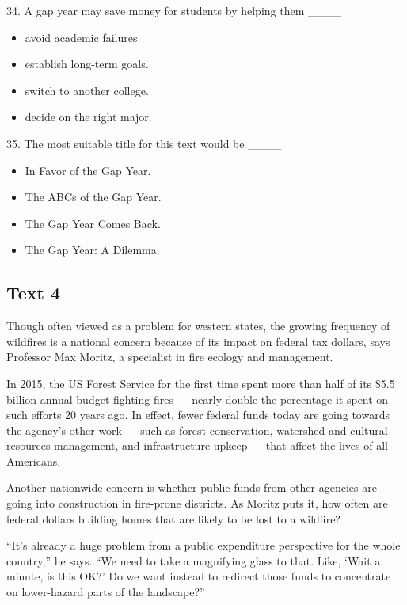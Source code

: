 \documentclass[UTF8,11pt]{ctexart}
\begin{document}
34. A gap year may save money for students by helping them \_\_\_\_


\begin{itemize}[leftmargin=2em,itemsep=.2em,topsep=.4em]\item[A.] avoid academic failures.
\item[B.] establish long-term goals.
\item[C.] switch to another college.
\item[D.] decide on the right major.
\end{itemize}

35. The most suitable title for this text would be \_\_\_\_


\begin{itemize}[leftmargin=2em,itemsep=.2em,topsep=.4em]\item[A.] In Favor of the Gap Year.
\item[B.] The ABCs of the Gap Year.
\item[C.] The Gap Year Comes Back.
\item[D.] The Gap Year: A Dilemma.
\end{itemize}

\subsection*{\textbf{Text 4}}


Though often viewed as a problem for western states, the growing frequency of wildfires is a national concern because of its impact on federal tax dollars, says Professor Max Moritz, a specialist in fire ecology and management.


In 2015, the US Forest Service for the first time spent more than half of its \$5.5 billion annual budget fighting fires — nearly double the percentage it spent on such efforts 20 years ago. In effect, fewer federal funds today are going towards the agency’s other work — such as forest conservation, watershed and cultural resources management, and infrastructure upkeep — that affect the lives of all Americans.


Another nationwide concern is whether public funds from other agencies are going into construction in fire-prone districts. As Moritz puts it, how often are federal dollars building homes that are likely to be lost to a wildfire?


“It’s already a huge problem from a public expenditure perspective for the whole country,” he says. “We need to take a magnifying glass to that. Like, ‘Wait a minute, is this OK?’ Do we want instead to redirect those funds to concentrate on lower-hazard parts of the landscape?”
\end{document}
